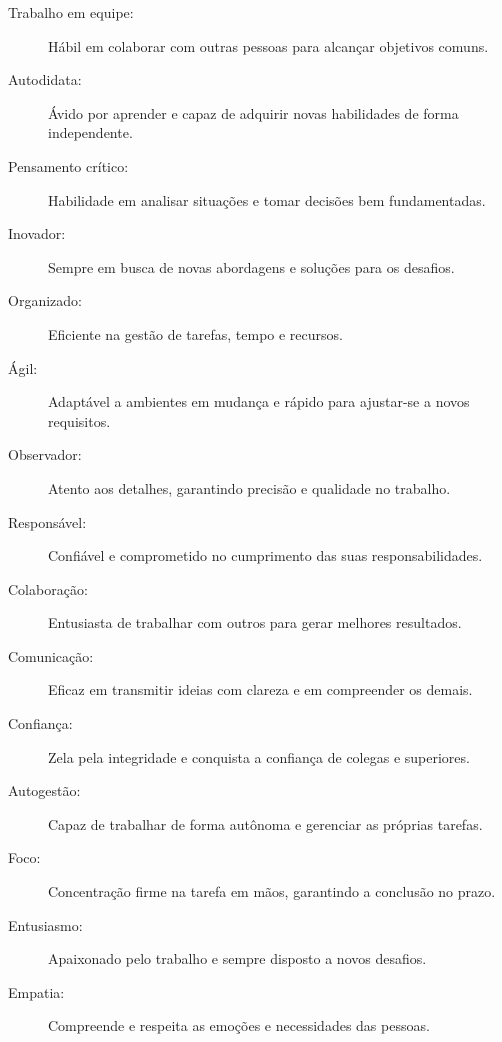
\begin{description}
    \item[Trabalho em equipe:] Hábil em colaborar com outras pessoas para alcançar objetivos comuns.
    \item[Autodidata:] Ávido por aprender e capaz de adquirir novas habilidades de forma independente.
    \item[Pensamento crítico:] Habilidade em analisar situações e tomar decisões bem fundamentadas.
    \item[Inovador:] Sempre em busca de novas abordagens e soluções para os desafios.
    \item[Organizado:] Eficiente na gestão de tarefas, tempo e recursos.
    \item[Ágil:] Adaptável a ambientes em mudança e rápido para ajustar-se a novos requisitos.
    \item[Observador:] Atento aos detalhes, garantindo precisão e qualidade no trabalho.
    \item[Responsável:] Confiável e comprometido no cumprimento das suas responsabilidades.
    \item[Colaboração:] Entusiasta de trabalhar com outros para gerar melhores resultados.
    \item[Comunicação:] Eficaz em transmitir ideias com clareza e em compreender os demais.
    \item[Confiança:] Zela pela integridade e conquista a confiança de colegas e superiores.
    \item[Autogestão:] Capaz de trabalhar de forma autônoma e gerenciar as próprias tarefas.
    \item[Foco:] Concentração firme na tarefa em mãos, garantindo a conclusão no prazo.
    \item[Entusiasmo:] Apaixonado pelo trabalho e sempre disposto a novos desafios.
    \item[Empatia:] Compreende e respeita as emoções e necessidades das pessoas.
\end{description}
